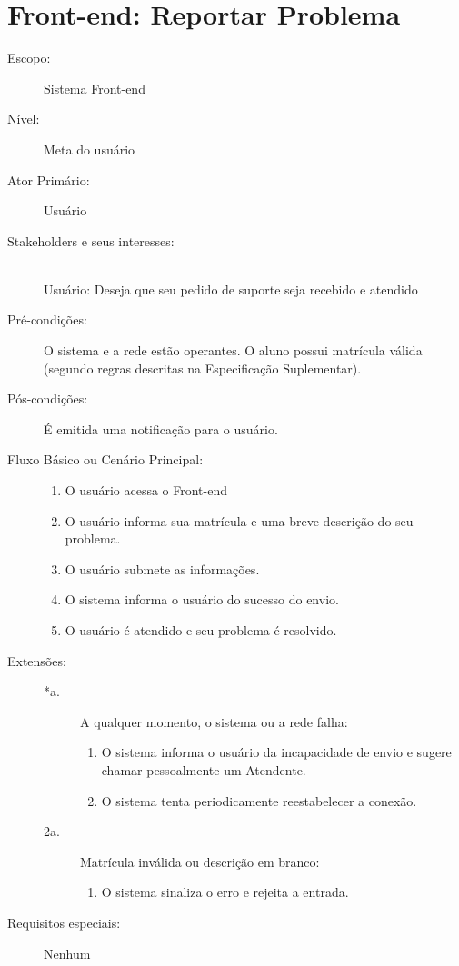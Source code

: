 \documentclass[brazil,times]{abnt}
\begin{document}
\section{Front-end: Reportar Problema}
\begin{description}
\item[Escopo:] Sistema Front-end
\item[Nível:] Meta do usuário
\item[Ator Primário:] Usuário

\item[Stakeholders e seus interesses:] \hfill \\ 
Usuário: Deseja que seu pedido de suporte seja recebido e atendido

\item[Pré-condições:] O sistema e a rede estão operantes. O aluno possui
matrícula válida (segundo regras descritas na Especificação Suplementar).

\item[Pós-condições:] É emitida uma notificação para o usuário.

\item[Fluxo Básico ou Cenário Principal:] \hfill
\begin{enumerate}
  \item O usuário acessa o Front-end
  \item O usuário informa sua matrícula e uma breve descrição do seu problema.
  \item O usuário submete as informações.
  \item O sistema informa o usuário do sucesso do envio.
  \item O usuário é atendido e seu problema é resolvido.
\end{enumerate}

\item[Extensões:] \hfill
\begin{description}
	\item[*a.] A qualquer momento, o sistema ou a rede falha:
		\begin{enumerate}
 			\item O sistema informa o usuário da incapacidade de envio e sugere chamar    
  			pessoalmente um Atendente.
  			\item  O sistema tenta periodicamente reestabelecer a conexão.
		\end{enumerate}

	\item[2a.] Matrícula inválida ou descrição em branco:
	\begin{enumerate}
		\item  O sistema sinaliza o erro e rejeita a entrada.
	\end{enumerate}
\end{description}
\item[Requisitos especiais:] Nenhum


\end{description}
\end{document}
